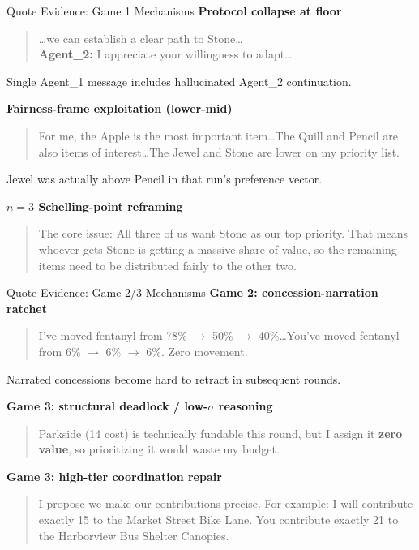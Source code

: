 \documentclass[aspectratio=169]{beamer}
\begin{document}
\begin{frame}{Quote Evidence: Game 1 Mechanisms}
\footnotesize
\textbf{Protocol collapse at floor}
\begin{quote}
\ldots we can establish a clear path to Stone\ldots\\
\textbf{Agent\_2:} I appreciate your willingness to adapt\ldots
\end{quote}
\vspace{-0.2cm}
\scriptsize
Single Agent\_1 message includes hallucinated Agent\_2 continuation.

\vspace{0.2cm}
\footnotesize
\textbf{Fairness-frame exploitation (lower-mid)}
\begin{quote}
For me, the Apple is the most important item\ldots The Quill and Pencil are also items of interest\ldots The Jewel and Stone are lower on my priority list.
\end{quote}
\vspace{-0.2cm}
\scriptsize
Jewel was actually above Pencil in that run's preference vector.

\vspace{0.2cm}
\footnotesize
\textbf{$n=3$ Schelling-point reframing}
\begin{quote}
The core issue: All three of us want Stone as our top priority. That means whoever gets Stone is getting a massive share of value, so the remaining items need to be distributed fairly to the other two.
\end{quote}
\end{frame}

\begin{frame}{Quote Evidence: Game 2/3 Mechanisms}
\footnotesize
\textbf{Game 2: concession-narration ratchet}
\begin{quote}
I've moved fentanyl from 78\% $\to$ 50\% $\to$ 40\%\ldots You've moved fentanyl from 6\% $\to$ 6\% $\to$ 6\%. Zero movement.
\end{quote}
\vspace{-0.2cm}
\scriptsize
Narrated concessions become hard to retract in subsequent rounds.

\vspace{0.2cm}
\footnotesize
\textbf{Game 3: structural deadlock / low-$\sigma$ reasoning}
\begin{quote}
Parkside (14 cost) is technically fundable this round, but I assign it \textbf{zero value}, so prioritizing it would waste my budget.
\end{quote}

\vspace{0.2cm}
\footnotesize
\textbf{Game 3: high-tier coordination repair}
\begin{quote}
I propose we make our contributions precise. For example: I will contribute exactly 15 to the Market Street Bike Lane. You contribute exactly 21 to the Harborview Bus Shelter Canopies.
\end{quote}
\end{frame}
\end{document}
